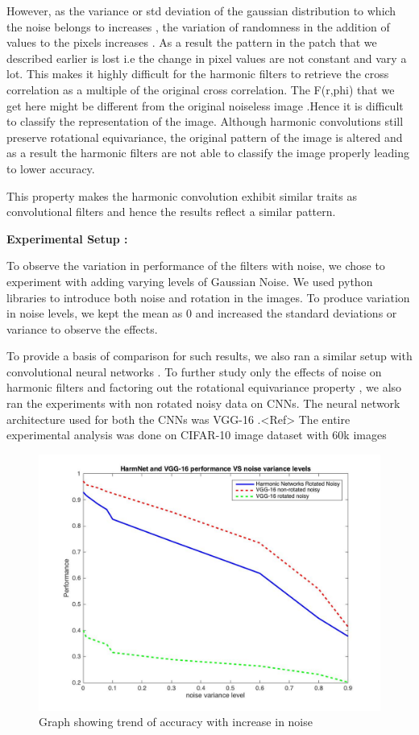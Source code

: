 \documentclass{article}
\begin{document}
However, as the variance or std deviation of the gaussian distribution to which the noise belongs to increases , the variation of randomness in the addition of values to the pixels increases . As a result the pattern in the patch that we described earlier is lost i.e the change in pixel values are not constant and vary a lot. This makes it highly difficult for the harmonic filters to retrieve the cross correlation as a multiple of the original cross correlation. The F(r,phi) that we get here might be different from the original noiseless image .Hence it is difficult to classify the representation of the image. Although harmonic convolutions still preserve rotational equivariance, the original pattern of the image is altered and as a result the harmonic filters are not able to classify the image properly leading to lower accuracy.

This property makes the harmonic convolution exhibit similar traits as convolutional filters and hence the results reflect a similar pattern.

\textbf{Experimental Setup :}

To observe the variation in performance of the filters with noise, we chose to experiment with adding varying levels of Gaussian Noise. We used python libraries to introduce both noise and rotation in the images. To produce variation in noise levels, we kept the mean as 0 and increased the standard deviations or variance to observe the effects. 

To provide a basis of comparison for such results, we also ran a similar setup with convolutional neural networks . To further study only the effects of noise on harmonic filters and factoring out the rotational equivariance property , we also ran the experiments with non rotated noisy data on CNNs. The neural network architecture used for both the CNNs was VGG-16 .<Ref>
The entire experimental analysis was done on CIFAR-10 image dataset with 60k images 

\begin{figure}[t!]
  \includegraphics[width=\linewidth]{vggAndHarmVsNoise.jpg}
  \caption{Graph showing trend of accuracy with increase in noise}
  \label{fig:NoiseGraph}
\end{figure}
 
\end{document}
